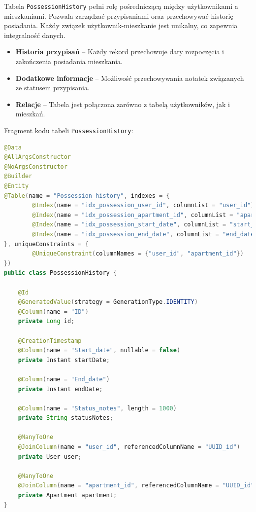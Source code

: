 Tabela \texttt{PossessionHistory} pełni rolę pośredniczącą między użytkownikami a mieszkaniami. Pozwala zarządzać przypisaniami oraz przechowywać historię posiadania. Każdy związek użytkownik-mieszkanie jest unikalny, co zapewnia integralność danych.

\begin{itemize}
    \item \textbf{Historia przypisań} -- Każdy rekord przechowuje daty rozpoczęcia i zakończenia posiadania mieszkania.
    \item \textbf{Dodatkowe informacje} -- Możliwość przechowywania notatek związanych ze statusem przypisania.
    \item \textbf{Relacje} -- Tabela jest połączona zarówno z tabelą użytkowników, jak i mieszkań.
\end{itemize}

Fragment kodu tabeli \texttt{PossessionHistory}:

\begin{lstlisting}[language=Java, style=JavaStyle, caption=Tabela pośrednicząca \texttt{PossessionHistory}]
@Data
@AllArgsConstructor
@NoArgsConstructor
@Builder
@Entity
@Table(name = "Possession_history", indexes = {
        @Index(name = "idx_possession_user_id", columnList = "user_id"),
        @Index(name = "idx_possession_apartment_id", columnList = "apartment_id"),
        @Index(name = "idx_possession_start_date", columnList = "start_date"),
        @Index(name = "idx_possession_end_date", columnList = "end_date")
}, uniqueConstraints = {
        @UniqueConstraint(columnNames = {"user_id", "apartment_id"})
})
public class PossessionHistory {

    @Id
    @GeneratedValue(strategy = GenerationType.IDENTITY)
    @Column(name = "ID")
    private Long id;

    @CreationTimestamp
    @Column(name = "Start_date", nullable = false)
    private Instant startDate;

    @Column(name = "End_date")
    private Instant endDate;

    @Column(name = "Status_notes", length = 1000)
    private String statusNotes;

    @ManyToOne
    @JoinColumn(name = "user_id", referencedColumnName = "UUID_id")
    private User user;

    @ManyToOne
    @JoinColumn(name = "apartment_id", referencedColumnName = "UUID_id")
    private Apartment apartment;
}
\end{lstlisting}

